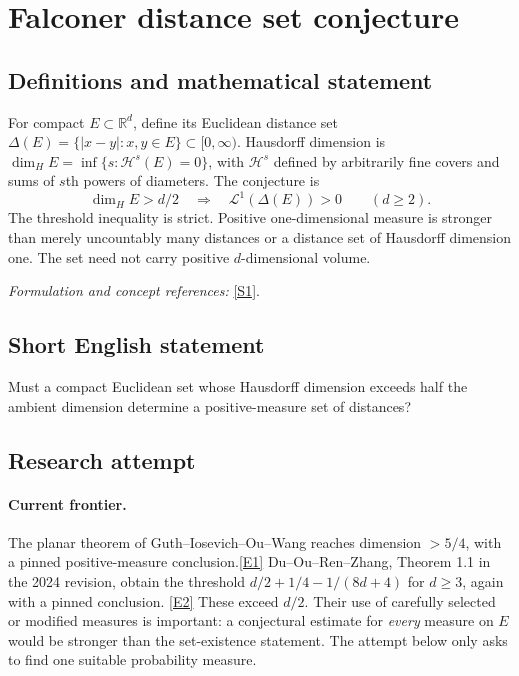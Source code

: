 \documentclass[11pt,a4paper]{article}
\newcommand{\R}{\mathbb{R}}
\newcommand{\sref}[2]{\hyperlink{source:#1:#2}{[S#2]}}
\newcommand{\eref}[2]{\hyperlink{extra:#1:#2}{[E#2]}}
\newif\ifshowcatalogue
\newcommand{\cataloguescope}[1]{\ifshowcatalogue
 \paragraph{Exact scope in the supplied catalogue.}
 \begin{quote}\small #1\end{quote}\fi}
\begin{document}
\setcounter{section}{208}
\clearpage
\section{\texorpdfstring{Falconer distance set conjecture}{Falconer distance set conjecture}}\label{209}
\subsection{Definitions and mathematical statement}
For compact $E\subset\R^d$, define its Euclidean distance set
$\Delta(E)=\{|x-y|:x,y\in E\}\subset[0,\infty)$. Hausdorff dimension is
$\dim_H E=\inf\{s:\mathcal H^s(E)=0\}$, with $\mathcal H^s$ defined by arbitrarily fine covers and sums of $s$th powers of diameters. The conjecture is
\[
 \dim_H E>d/2\quad\Longrightarrow\quad \mathcal L^1(\Delta(E))>0
 \qquad(d\ge2).
\]
The threshold inequality is strict. Positive one-dimensional measure is stronger than merely uncountably many distances or a distance set of Hausdorff dimension one. The set need not carry positive $d$-dimensional volume.
\par\smallskip\textit{Formulation and concept references:} \sref{209}{1}.
\cataloguescope{Prove or disprove that for every integer d>=2 and every compact set E in R\textasciicircum{}d with Hausdorff dimension greater than d/2, the distance set Delta(E)=\{|x-y|: x,y in E\} has positive one-dimensional Lebesgue measure.}
\subsection{Short English statement}
Must a compact Euclidean set whose Hausdorff dimension exceeds half the ambient dimension determine a positive-measure set of distances?
\subsection{Research attempt}

\paragraph{Current frontier.}
The planar theorem of Guth--Iosevich--Ou--Wang reaches dimension $>5/4$,
with a pinned positive-measure conclusion.\eref{209}{1}
Du--Ou--Ren--Zhang, Theorem 1.1 in the 2024 revision, obtain the threshold
$d/2+1/4-1/(8d+4)$ for $d\ge3$, again with a pinned conclusion.
\eref{209}{2} These exceed $d/2$. Their use of carefully selected or modified
measures is important: a conjectural estimate for \emph{every} measure on
$E$ would be stronger than the set-existence statement. The attempt below
only asks to find one suitable probability measure.
\end{document}

